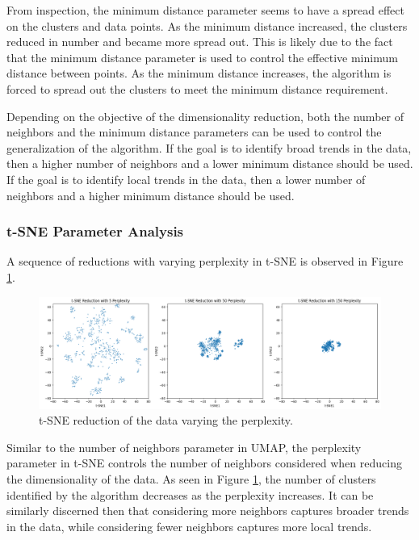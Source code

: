 \documentclass[12pt]{article}
\begin{document}
\vspace{-0.5cm}

From inspection, the minimum distance parameter seems to have a spread effect on the clusters and data points. As the minimum distance increased, the clusters reduced in number and became more spread out. This is likely due to the fact that the minimum distance parameter is used to control the effective minimum distance between points. As the minimum distance increases, the algorithm is forced to spread out the clusters to meet the minimum distance requirement.

Depending on the objective of the dimensionality reduction, both the number of neighbors and the minimum distance parameters can be used to control the generalization of the algorithm. If the goal is to identify broad trends in the data, then a higher number of neighbors and a lower minimum distance should be used. If the goal is to identify local trends in the data, then a lower number of neighbors and a higher minimum distance should be used.

\subsubsection{t-SNE Parameter Analysis}
A sequence of reductions with varying perplexity in t-SNE is observed in Figure \ref{fig:TSNE_vary}.

\begin{figure}[H]
    \centering
    \includegraphics[width=\textwidth]{Images/t-sne_vary.png}
    \caption{t-SNE reduction of the data varying the perplexity.}
    \label{fig:TSNE_vary}
\end{figure}

\vspace{-0.5cm}

Similar to the number of neighbors parameter in UMAP, the perplexity parameter in t-SNE controls the number of neighbors considered when reducing the dimensionality of the data. As seen in Figure \ref{fig:TSNE_vary}, the number of clusters identified by the algorithm decreases as the perplexity increases. It can be similarly discerned then that considering more neighbors captures broader trends in the data, while considering fewer neighbors captures more local trends.
\end{document}
